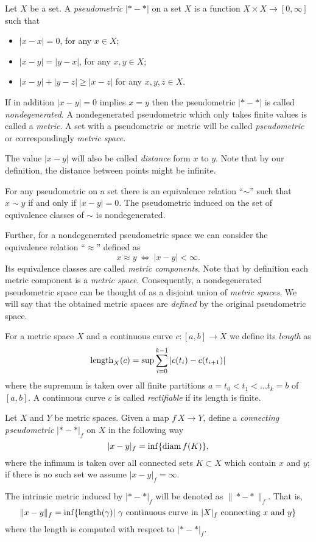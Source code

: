 \documentclass{article}
\begin{document}
Let $X$ be a set.
A \emph{pseudometric} $|{*}-{*}|$ on a set $X$ 
is a function $X\times X\to[0,\infty]$
such that 
\begin{itemize}
\item $|x-x|=0$, for any $x\in X$;
\item $|x-y|=|y-x|$, for any $x,y\in X$;
\item $|x-y|+|y-z|\ge|x-z|$ for any  $x,y,z\in X$.
\end{itemize}
If in addition $|x-y|=0$ implies $x=y$ then the pseudometric $|{*}-{*}|$ is called \emph{nondegenerated}.
A nondegenerated pseudometric which only takes finite values is called a \emph{metric}. A set with a pseudometric 
or metric will be called \emph{pseudometric} or correspondingly \emph{metric space}.

The value $|x-y|$ will also be called \emph{distance} form $x$ to $y$.
Note that by our definition, the distance between points might be infinite.

For any pseudometric on a set 
there is an equivalence relation ``$\sim$''
such that $x\sim y$ if and only if $|x-y|=0$.
The pseudometric induced  on the set of equivalence classes of $\sim$ is nondegenerated.

Further, for a nondegenerated pseudometric space we can consider the equivalence relation ``$\approx$'' defined as \[x\approx y\  \iff\  |x-y|<\infty.\]
Its equivalence classes are called \emph{metric components}.
Note that by definition each metric component is a \emph{metric space}.
Consequently, a nondegenerated pseudometric space 
can be thought of as a disjoint union of \emph{metric spaces}.
We will say that the obtained metric spaces are \emph{defined} by the  
original pseudometric space.%

For a metric space $X$ and a continuous curve $c:[a,b]\to X$ we define its {\em length} as
\[\mathop{\rm length}\nolimits_X(c)=\sup\sum_{i=0}^{k-1} |c(t_i)-c(t_{i+1})|\]
where the supremum is taken over all finite partitions ${a=t_0<t_1<\ldots t_k=b}$ of $[a,b]$. 
A continuous curve $c$ is called {\em rectifiable} if its length is finite.

Let $X$ and $Y$ be metric spaces.
Given a map $f\:X\to Y$,
define a \emph{connecting pseudometric} $|{*}-{*}|_f$ on $X$ in
the following way
\[|x-y|_f=\inf\{\mathop{\rm diam}\nolimits f(K)\},\]
where the infimum is taken over all connected sets $K\subset X$ which contain $x$ and $y$;
if there is no such set we assume $|x-y|_f=\infty$.

The intrinsic metric induced by $|{*}-{*}|_f$ will be denoted as 
$\|{*}-{*}\|_f$. 
That is, 
\[\|x-y\|_f=\inf\{\length(\gamma)|\ \gamma \text{ continuous curve in } |X|_f \text{ connecting } x \text{ and } y\}\]
where the length is computed with respect to $|{*}-{*}|_f$.
\end{document}
